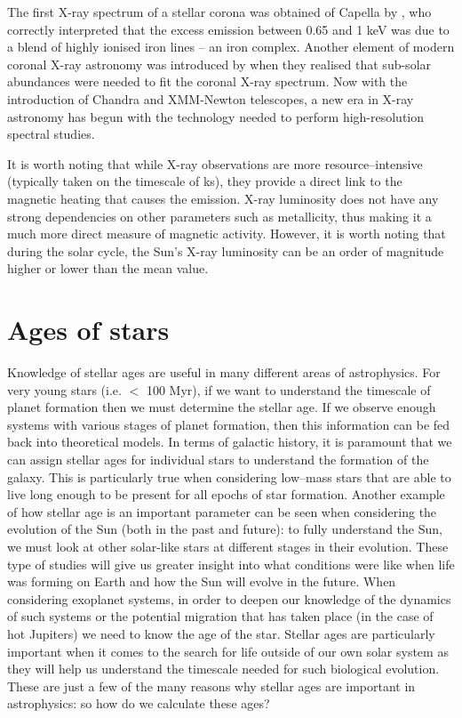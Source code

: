 The first X-ray spectrum of a stellar corona was obtained of Capella by \citet{Cash_etal_1978}, who correctly interpreted that the excess emission between 0.65 and 1 keV was due to a blend of highly ionised iron lines -- an iron complex. Another element of modern coronal X-ray astronomy was introduced by \citet{Walter_etal_1978} when they realised that sub-solar abundances were needed to fit the coronal X-ray spectrum. Now with the introduction of Chandra and XMM-Newton telescopes, a new era in X-ray astronomy has begun with the technology needed to perform high-resolution spectral studies.

It is worth noting that while X-ray observations are more resource--intensive (typically taken on the timescale of ks), they provide a direct link to the magnetic heating that causes the emission. X-ray luminosity does not have any strong dependencies on other parameters such as metallicity, thus making it a much more direct measure of magnetic activity. However, it is worth noting that during the solar cycle, the Sun's X-ray luminosity can be an order of magnitude higher or lower than the mean value.


\section{Ages of stars}
\label{Section:intro_ages}
Knowledge of stellar ages are useful in many different areas of astrophysics. For very young stars (i.e. $<$ 100 Myr), if we want to understand the timescale of planet formation then we must determine the stellar age. If we observe enough systems with various stages of planet formation, then this information can be fed back into theoretical models. In terms of galactic history, it is paramount that we can assign stellar ages for individual stars to understand the formation of the galaxy. This is particularly true when considering low--mass stars that are able to live long enough to be present for all epochs of star formation. Another example of how stellar age is an important parameter can be seen when considering the evolution of the Sun (both in the past and future): to fully understand the Sun, we must look at other solar-like stars at different stages in their evolution. These type of studies will give us greater insight into what conditions were like when life was forming on Earth and how the Sun will evolve in the future. When considering exoplanet systems, in order to deepen our knowledge of the dynamics of such systems or the potential migration that has taken place (in the case of hot Jupiters) we need to know the age of the star. Stellar ages are particularly important when it comes to the search for life outside of our own solar system as they will help us understand the timescale needed for such biological evolution. These are just a few of the many reasons why stellar ages are important in astrophysics: so how do we calculate these ages?

